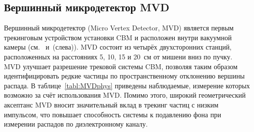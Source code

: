 

\subsection{Вершинный микродетектор MVD}\label{sec:secMVD}

\begin{minipage}[t]{0.495\textwidth}
Вершинный микродетектор (Micro Vertex Detector, MVD) является первым трекинговым устройством установки CBM и расположен внутри вакуумной камеры (см.~ и~(слева)). MVD состоит из четырёх двухсторонних станций, расположенных на расстояниях 5, 10, 15 и 20~см от мишени вниз по пучку.
MVD улучшает разрешение трековой системы CBM, позволяя таким образом идентифицировать редкие частицы по пространственному отклонению вершины распада. В таблице~\ref{tabl:MVDphys} приведены наблюдаемые, измерение которых возможно за счёт использования MVD.
Помимо этого, широкий геометрический аксептанс MVD вносит значительный вклад в трекинг частиц с низким импульсом, что повышает способность системы к подавлению фона при измерении распадов по диэлектронному каналу.
\end{minipage}
